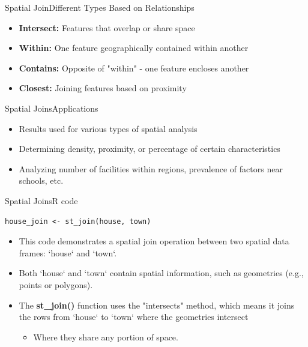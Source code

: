 \documentclass[dvipsnames,hyperref={pdfpagelabels=false}]{beamer}
\begin{document}
\begin{frame}{Spatial Join}{Different Types Based on Relationships}

	\begin{itemize}
		\item \textbf{Intersect:} Features that overlap or share space
							\vspace{0.2cm}
		\item \textbf{Within:} One feature geographically contained within another
							\vspace{0.2cm}
		\item \textbf{Contains:} Opposite of "within" - one feature encloses another
							\vspace{0.2cm}
		\item \textbf{Closest:} Joining features based on proximity
	\end{itemize}
\end{frame}

\begin{frame}{Spatial Joins}{Applications}
	\begin{itemize}
		\item Results used for various types of spatial analysis
									\vspace{0.2cm}
		\item Determining density, proximity, or percentage of certain characteristics
									\vspace{0.2cm}
		\item Analyzing number of facilities within regions, prevalence of factors near schools, etc.
	\end{itemize}
\end{frame}




\begin{frame}[fragile]{Spatial Joins}{R code}
\begin{lstlisting}
house_join <- st_join(house, town)
\end{lstlisting}
\begin{itemize}
	\item This code demonstrates a spatial join operation between two spatial data frames: `house` and `town`.
	\vspace{0.2cm}
	\item Both `house` and `town` contain spatial information, such as geometries (e.g., points or polygons).
	\vspace{0.2cm}
	\item The \textbf{st\_join()} function uses the "intersects" method, which means it joins the rows from `house` to `town` where the geometries intersect
	\vspace{0.2cm}
	\begin{itemize}
		\item Where they share any portion of space.
	\end{itemize}
\end{itemize}
\end{frame}
\end{document}
